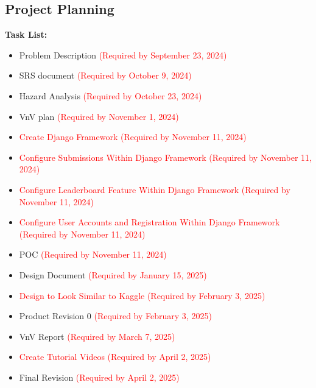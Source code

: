 \documentclass[12pt]{article}
\begin{document}
\subsection{Project Planning}
\textbf{Task List:}
\begin{itemize}
    \item Problem Description \textcolor{red}{(Required by September 23, 2024)}
    \item SRS document \textcolor{red}{(Required by October 9, 2024)}
    \item Hazard Analysis \textcolor{red}{(Required by October 23, 2024)}
    \item VnV plan \textcolor{red}{(Required by November 1, 2024)}
    \item \textcolor{red}{Create Django Framework (Required by November 11, 2024)}
    \item \textcolor{red}{Configure Submissions Within Django Framework (Required by November 11, 2024)}
    \item \textcolor{red}{Configure Leaderboard Feature Within Django Framework (Required by November 11, 2024)}
    \item \textcolor{red}{Configure User Accounts and Registration Within Django Framework (Required by November 11, 2024)}
    \item POC \textcolor{red}{(Required by November 11, 2024)}
    \item Design Document \textcolor{red}{(Required by January 15, 2025)}
    \item \textcolor{red}{Design to Look Similar to Kaggle (Required by February 3, 2025)}
    \item Product Revision 0 \textcolor{red}{(Required by February 3, 2025)}
    \item VnV Report \textcolor{red}{(Required by March 7, 2025)}
    \item \textcolor{red}{Create Tutorial Videos (Required by April 2, 2025)}
    \item Final Revision \textcolor{red}{(Required by April 2, 2025)}
\end{itemize}
\end{document}
